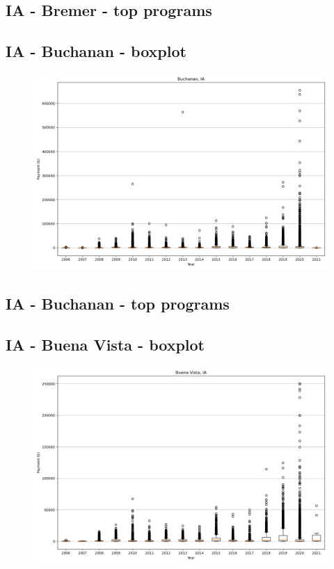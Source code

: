 \subsection*{IA - Bremer - top programs}

\newpage
\subsection*{IA - Buchanan - boxplot}
\begin{figure}[h]
\centering
\includegraphics[width=7in]{../output/boxplots/counties/Buchanan-IA_boxplot.png}
\end{figure}


\subsection*{IA - Buchanan - top programs}

\newpage
\subsection*{IA - Buena Vista - boxplot}
\begin{figure}[h]
\centering
\includegraphics[width=7in]{../output/boxplots/counties/Buena Vista-IA_boxplot.png}
\end{figure}


